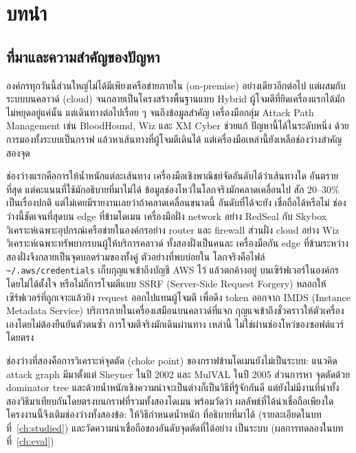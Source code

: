 \chapter{บทนำ}

\section{ที่มาและความสำคัญของปัญหา}\label{sec:intro-background}

องค์กรทุกวันนี้ส่วนใหญ่ไม่ได้มีเพียงเครือข่ายภายใน (on-premise) อย่างเดียวอีกต่อไป
แต่ผสมกับระบบบนคลาวด์ (cloud) จนกลายเป็นโครงสร้างพื้นฐานแบบ Hybrid
ผู้โจมตีที่ยึดเครื่องแรกได้มักไม่หยุดอยู่แค่นั้น แต่เดินทางต่อไปเรื่อย ๆ จนถึงข้อมูลสำคัญ
เครื่องมือกลุ่ม Attack Path Management เช่น BloodHound, Wiz และ XM Cyber ช่วยแก้
ปัญหานี้ได้ในระดับหนึ่ง ด้วยการมองทั้งระบบเป็นกราฟ แล้วหาเส้นทางที่ผู้โจมตีเดินได้
แต่เครื่องมือเหล่านี้ยังเหลือช่องว่างสำคัญสองจุด

ช่องว่างแรกคือการให้น้ำหนักแต่ละเส้นทาง เครื่องมือเชิงพาณิชย์จัดอันดับได้ว่าเส้นทางใด
อันตรายที่สุด แต่คะแนนที่ใช้มักอธิบายที่มาไม่ได้ ข้อมูลช่องโหว่ในโลกจริงมักคลาดเคลื่อนไป
สัก 20--30\% เป็นเรื่องปกติ แต่ไม่เคยมีรายงานเลยว่าถ้าคลาดเคลื่อนขนาดนี้ อันดับที่ได้จะยัง
เชื่อถือได้หรือไม่ ช่องว่างนี้ชัดเจนที่สุดบน edge ที่ข้ามโดเมน เครื่องมือฝั่ง network อย่าง
RedSeal กับ Skybox วิเคราะห์เฉพาะอุปกรณ์เครือข่ายในองค์กรอย่าง router และ firewall
ส่วนฝั่ง cloud อย่าง Wiz วิเคราะห์เฉพาะทรัพยากรบนผู้ให้บริการคลาวด์ ทั้งสองฝั่งเป็นคนละ
เครื่องมือกัน edge ที่ข้ามระหว่างสองฝั่งจึงกลายเป็นจุดบอดร่วมของทั้งคู่ ตัวอย่างที่พบบ่อยใน
โลกจริงคือไฟล์ \texttt{\~{}/.aws/credentials} เก็บกุญแจเข้าถึงบัญชี AWS ไว้ แล้วตกค้างอยู่
บนเซิร์ฟเวอร์ในองค์กรโดยไม่ได้ตั้งใจ หรือไม่ก็การโจมตีแบบ SSRF (Server-Side Request
Forgery) หลอกให้เซิร์ฟเวอร์ที่ถูกเจาะแล้วยิง request ออกไปแทนผู้โจมตี เพื่อดึง token
ออกจาก IMDS (Instance Metadata Service) บริการภายในเครื่องเสมือนบนคลาวด์ที่แจก
กุญแจเข้าถึงชั่วคราวให้ตัวเครื่องเองโดยไม่ต้องยืนยันตัวตนซ้ำ การโจมตีจริงมักเดินผ่านทาง
เหล่านี้ ไม่ใช่ผ่านช่องโหว่ของซอฟต์แวร์โดยตรง

ช่องว่างที่สองคือการวิเคราะห์จุดตัด (choke point) ของกราฟข้ามโดเมนยังไม่เป็นระบบ:
แนวคิด attack graph มีมาตั้งแต่ Sheyner ในปี 2002 และ MulVAL ในปี 2005 ส่วนการหา
จุดตัดด้วย dominator tree และด้วยน้ำหนักเชิงความน่าจะเป็นต่างก็เป็นวิธีที่รู้จักกันดี
แต่ยังไม่มีงานที่นำทั้งสองวิธีมาเทียบกันโดยตรงบนกราฟที่รวมทั้งสองโดเมน พร้อมวัดว่า
ผลลัพธ์ที่ได้น่าเชื่อถือเพียงใด โครงงานนี้จึงเติมช่องว่างทั้งสองข้อ: ให้วิธีกำหนดน้ำหนัก
ที่อธิบายที่มาได้ (รายละเอียดในบทที่~\ref{ch:studied}) และวัดความน่าเชื่อถือของอันดับจุดตัดที่ได้อย่าง
เป็นระบบ (ผลการทดลองในบทที่~\ref{ch:eval})

